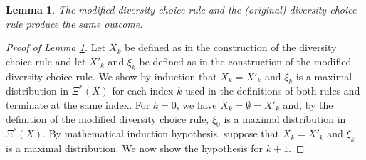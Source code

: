 \documentclass[12pt]{amsart}
\newtheorem{lemma}{Lemma}
\theoremstyle{remark}
\begin{document}
\begin{lemma} \label{lem:choice-equivalence}
The modified diversity choice rule and the (original) diversity choice rule produce the same outcome.
\end{lemma}
\begin{proof}[Proof of Lemma \ref{lem:choice-equivalence}]\renewcommand{\qedsymbol}{$\blacksquare$}
Let $X_k$ be defined as in the construction of the diversity choice rule and let $X'_k$ and $\xi_k$ be defined as in the construction of the modified diversity choice rule.
We show by induction that $X_k=X'_k$ and $\xi_k$ is a maximal distribution in $\Xi^*(X)$ for each index $k$ used in the definitions of both rules and terminate at the same index.
For $k=0$, we have $X_k=\emptyset=X'_k$ and, by the definition of the modified diversity choice rule, $\xi_0$ is a maximal distribution in $\Xi^*(X)$.
By mathematical induction hypothesis, suppose that $X_k=X'_k$ and $\xi_k$ is a maximal distribution. We now show the hypothesis for $k+1$.


\end{proof}
\end{document}
